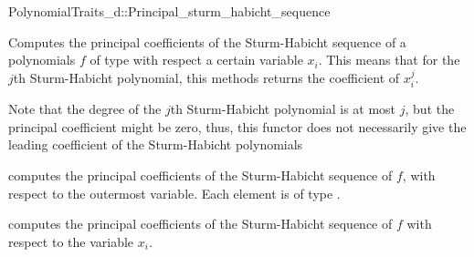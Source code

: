 \begin{ccRefConcept}{PolynomialTraits_d::Principal_sturm_habicht_sequence}
\ccDefinition

Computes the principal coefficients of the Sturm-Habicht sequence 
of a polynomials $f$ of type  
with respect a certain variable $x_i$.
This means that for the $j$th Sturm-Habicht polynomial, this methods returns
the coefficient of $x_i^j$. 

Note that the degree of the $j$th Sturm-Habicht polynomial is at most $j$,
but the principal coefficient might be zero, thus, this functor does not
necessarily give the leading coefficient of the Sturm-Habicht polynomials

\ccOperations
{}
         { computes the principal coefficients of the 
           Sturm-Habicht sequence of $f$, 
           with respect to the outermost variable. Each element is of type
           .}

         { computes the principal coefficients 
           of the Sturm-Habicht sequence of $f$ 
           with respect to the variable $x_i$.}


\ccSeeAlso

\\
\\

\end{ccRefConcept}
